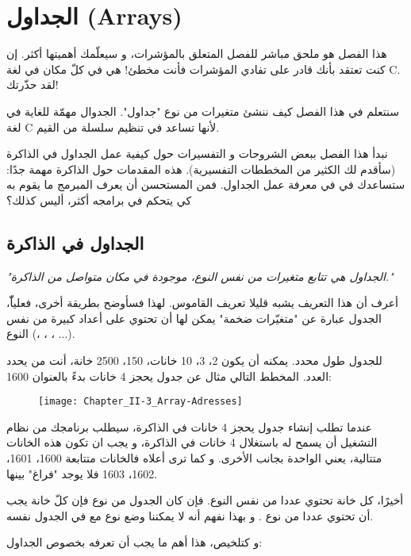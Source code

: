 \chapter{الجداول (\textenglish{Arrays})}

هذا الفصل هو ملحق مباشر للفصل المتعلق بالمؤشرات، و سيعلّمك أهميتها أكثر. إن كنت تعتقد بأنك قادر على تفادي المؤشرات فأنت مخطئ! هي في كلّ مكان في لغة \textenglish{C}. لقد حذّرتك!

سنتعلم في هذا الفصل كيف ننشئ متغيرات من نوع "جداول". الجدوال مهمّة للغاية في لغة \textenglish{C} لأنها تساعد في تنظيم سلسلة من القيم.

نبدأ هذا الفصل ببعض الشروحات و التفسيرات حول كيفية عمل الجداول في الذاكرة (سأقدم لك الكثير من المخططات التفسيرية). هذه المقدمات حول الذاكرة مهمة جدًا: ستساعدك في في معرفة عمل الجداول. فمن المستحسن أن يعرف المبرمج ما يقوم به كي يتحكم في برامجه أكثر، أليس كذلك؟

\section{الجداول في الذاكرة}

\textit{"الجداول هي تتابع متغيرات من نفس النوع، موجودة في مكان متواصل من الذاكرة."}

أعرف أن هذا التعريف يشبه قليلا تعريف القاموس. لهذا فسأوضح بطريقة أخرى، فعلياّّ، الجدول عبارة عن "متغيّرات ضخمة" يمكن لها أن تحتوي على أعداد كبيرة من نفس النوع
(،
،
،
...).

للجدول طول محدد. يمكنه أن يكون 2، 3، 10 خانات، 150، 2500 خانة، أنت من يحدد العدد. المخطط التالي مثال عن جدول يحجز 4 خانات بدءً بالعنوان 1600:

\begin{figure}[H]
	\centering
	\texttt{[image: Chapter\_II-3\_Array-Adresses]}
\end{figure}

عندما تطلب إنشاء جدول يحجز 4 خانات في الذاكرة، سيطلب برنامجك من نظام التشغيل أن يسمح له باستغلال 4 خانات في الذاكرة، و يجب ان تكون هذه الخانات متتالية، يعني الواحدة بجانب الأخرى. و كما ترى أعلاه فالخانات متتابعة 1600، 1601، 1602، 1603 فلا يوجد "فراغ" بينها.

أخيرًا، كل خانة تحتوي عددا من نفس النوع. فإن كان الجدول من نوع
فإن كلّ خانة يجب أن تحتوي عددا من نوع
.
و بهذا نفهم أنه لا يمكننا وضع نوع
مع
في الجدول نفسه.

و كتلخيص، هذا أهم ما يجب أن تعرفه بخصوص الجداول:

